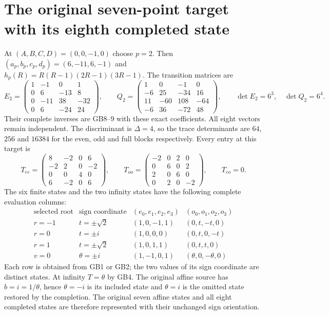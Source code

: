 \documentclass[11pt]{article}
\begin{document}
\section{The original seven-point target with its eighth completed state}
At $(A,B,C,D)=(0,0,-1,0)$ choose $p=2$.
Then $(a_p,b_p,c_p,d_p)=(6,-11,6,-1)$ and
$h_p(R)=R(R-1)(2R-1)(3R-1)$. The transition matrices are
\begin{equation}
 E_2=\begin{pmatrix}
 1&-1&0&1\\0&6&-13&8\\0&-11&38&-32\\0&6&-24&24
 \end{pmatrix},\qquad
 Q_2=\begin{pmatrix}
 1&0&-1&0\\-6&25&-34&16\\11&-60&108&-64\\-6&36&-72&48
 \end{pmatrix},
 \qquad \det E_2=6^3,\quad\det Q_2=6^4.
 \tag{GB20}
\end{equation}
Their complete inverses are GB8--9 with these exact coefficients.
All eight vectors remain independent. The discriminant is
$\Delta=4$, so the trace determinants are $64$, $256$ and
$16384$ for the even, odd and full blocks respectively.
Every entry at this target is
\begin{equation}
 T_{ee}=\begin{pmatrix}
 8&-2&0&6\\-2&2&0&-2\\0&0&4&0\\6&-2&0&6
 \end{pmatrix},\qquad
 T_{oo}=\begin{pmatrix}
 -2&0&2&0\\0&6&0&2\\2&0&6&0\\0&2&0&-2
 \end{pmatrix},\qquad T_{eo}=0.
 \tag{GB21}
\end{equation}
The six finite states and the two infinity states have the
following complete evaluation columns:
\begin{equation}
 \begin{array}{c|c|c|c}
 \text{selected root}&\text{sign coordinate}&(e_0,e_1,e_2,e_3)&
                    (o_0,o_1,o_2,o_3)\\\hline
 r=-1&t=\pm\sqrt2&(1,0,-1,1)&(0,t,-t,0)\\
 r=0&t=\pm i&(1,0,0,0)&(0,t,0,-t)\\
 r=1&t=\pm\sqrt2&(1,0,1,1)&(0,t,t,0)\\
 v=0&\theta=\pm i&(1,-1,0,1)&(\theta,0,-\theta,0)
 \end{array}
 \tag{GB22}
\end{equation}
Each row is obtained from GB1 or GB2; the two values of its
sign coordinate are distinct states. At infinity $T=\theta$
by GB4. The original affine source has $b=i=1/\theta$, hence
$\theta=-i$ is its included state and $\theta=i$ is the
omitted state restored by the completion. The original seven
affine states and all eight completed states are therefore
represented with their unchanged sign orientation.
\end{document}
